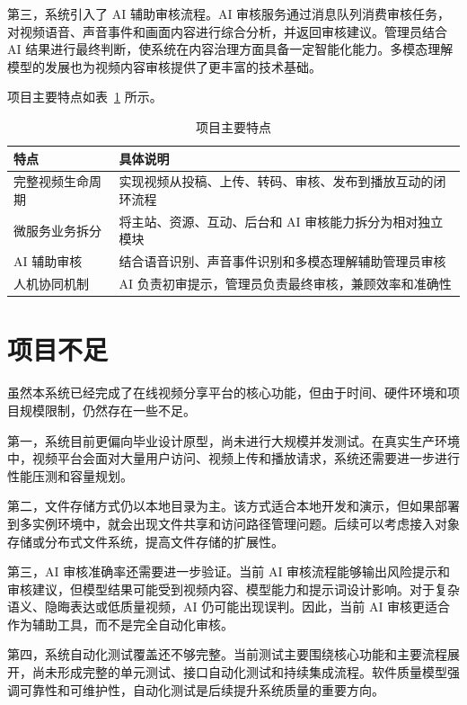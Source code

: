 第三，系统引入了 AI 辅助审核流程。AI 审核服务通过消息队列消费审核任务，对视频语音、声音事件和画面内容进行综合分析，并返回审核建议。管理员结合 AI 结果进行最终判断，使系统在内容治理方面具备一定智能化能力。多模态理解模型的发展也为视频内容审核提供了更丰富的技术基础\cite{bai2023qwen}。

项目主要特点如表~\ref{tab:project-features} 所示。

\begin{table}[htbp]
  \centering
  \caption{项目主要特点}
  \label{tab:project-features}
  \begin{tabular}{p{}p{}}
    \hline
    \textbf{特点} & \textbf{具体说明} \\
    \hline
    完整视频生命周期 & 实现视频从投稿、上传、转码、审核、发布到播放互动的闭环流程 \\
    微服务业务拆分 & 将主站、资源、互动、后台和 AI 审核能力拆分为相对独立模块 \\
    AI 辅助审核 & 结合语音识别、声音事件识别和多模态理解辅助管理员审核 \\
    人机协同机制 & AI 负责初审提示，管理员负责最终审核，兼顾效率和准确性 \\
    \hline
  \end{tabular}
\end{table}

\section{项目不足}
\label{sec:project-limitations}

虽然本系统已经完成了在线视频分享平台的核心功能，但由于时间、硬件环境和项目规模限制，仍然存在一些不足。

第一，系统目前更偏向毕业设计原型，尚未进行大规模并发测试。在真实生产环境中，视频平台会面对大量用户访问、视频上传和播放请求，系统还需要进一步进行性能压测和容量规划。

第二，文件存储方式仍以本地目录为主。该方式适合本地开发和演示，但如果部署到多实例环境中，就会出现文件共享和访问路径管理问题。后续可以考虑接入对象存储或分布式文件系统，提高文件存储的扩展性。

第三，AI 审核准确率还需要进一步验证。当前 AI 审核流程能够输出风险提示和审核建议，但模型结果可能受到视频内容、模型能力和提示词设计影响。对于复杂语义、隐晦表达或低质量视频，AI 仍可能出现误判。因此，当前 AI 审核更适合作为辅助工具，而不是完全自动化审核。

第四，系统自动化测试覆盖还不够完整。当前测试主要围绕核心功能和主要流程展开，尚未形成完整的单元测试、接口自动化测试和持续集成流程。软件质量模型强调可靠性和可维护性，自动化测试是后续提升系统质量的重要方向\cite{iso25010}。

